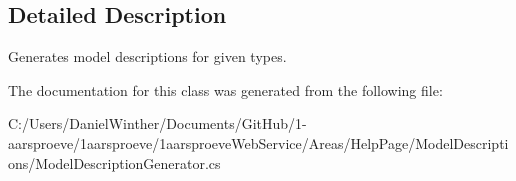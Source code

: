 \subsection{Detailed Description}
Generates model descriptions for given types. 



The documentation for this class was generated from the following file\+:\begin{DoxyCompactItemize}
\item 
C\+:/\+Users/\+Daniel\+Winther/\+Documents/\+Git\+Hub/1-\/aarsproeve/1aarsproeve/1aarsproeve\+Web\+Service/\+Areas/\+Help\+Page/\+Model\+Descriptions/Model\+Description\+Generator.\+cs\end{DoxyCompactItemize}
